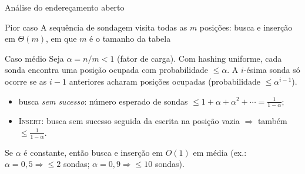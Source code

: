 \documentclass[aspectratio=169,10pt]{beamer}
\newcommand{\proc}[1]{\textnormal{\rmfamily\textsc{#1}}}
\begin{document}
\begin{frame}{Análise do endereçamento aberto}
  \begin{alertblock}{Pior caso}
    A sequência de sondagem visita todas as $m$ posições: busca e inserção em $\Theta(m)$, em que $m$ é o tamanho da tabela
  \end{alertblock}
  \begin{block}{Caso médio}
    Seja $\alpha = n/m < 1$ (fator de carga). Com hashing uniforme, cada sonda encontra uma posição
    ocupada com probabilidade $\le \alpha$. A $i$-ésima sonda só ocorre se as $i-1$ anteriores
    acharam posições ocupadas (probabilidade $\le \alpha^{i-1}$).
    \begin{itemize}
      \item busca \emph{sem sucesso}: número esperado de sondas
            $\le 1 + \alpha + \alpha^2 + \cdots = \frac{1}{1-\alpha}$;
      \item \proc{Insert}: busca sem sucesso seguida da escrita na posição vazia
            $\Rightarrow$ também $\le \frac{1}{1-\alpha}$.
    \end{itemize}
    Se $\alpha$ é constante, então \alert{busca e inserção em $O(1)$ em média}
    (ex.: $\alpha = 0{,}5 \Rightarrow \le 2$ sondas; $\alpha = 0{,}9 \Rightarrow \le 10$ sondas).
  \end{block}
\end{frame}
\end{document}
